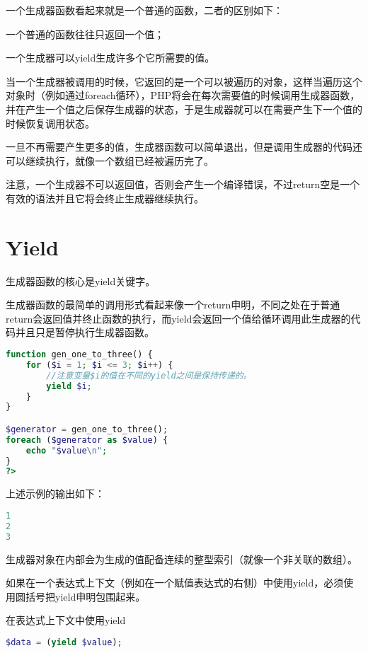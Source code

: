 一个生成器函数看起来就是一个普通的函数，二者的区别如下：

\begin{compactitem}
\item 一个普通的函数往往只返回一个值；
\item 一个生成器可以yield生成许多个它所需要的值。
\end{compactitem}

当一个生成器被调用的时候，它返回的是一个可以被遍历的对象，这样当遍历这个对象时（例如通过foreach循环），PHP将会在每次需要值的时候调用生成器函数，并在产生一个值之后保存生成器的状态，于是生成器就可以在需要产生下一个值的时候恢复调用状态。

一旦不再需要产生更多的值，生成器函数可以简单退出，但是调用生成器的代码还可以继续执行，就像一个数组已经被遍历完了。

注意，一个生成器不可以返回值，否则会产生一个编译错误，不过return空是一个有效的语法并且它将会终止生成器继续执行。

\section{Yield}

生成器函数的核心是yield关键字。

生成器函数的最简单的调用形式看起来像一个return申明，不同之处在于普通return会返回值并终止函数的执行，而yield会返回一个值给循环调用此生成器的代码并且只是暂停执行生成器函数。

\begin{lstlisting}[language=PHP]
function gen_one_to_three() {
    for ($i = 1; $i <= 3; $i++) {
        //注意变量$i的值在不同的yield之间是保持传递的。
        yield $i;
    }
}

$generator = gen_one_to_three();
foreach ($generator as $value) {
    echo "$value\n";
}
?>
\end{lstlisting}

上述示例的输出如下：

\begin{lstlisting}[language=PHP]
1
2
3
\end{lstlisting}

生成器对象在内部会为生成的值配备连续的整型索引（就像一个非关联的数组）。

如果在一个表达式上下文（例如在一个赋值表达式的右侧）中使用yield，必须使用圆括号把yield申明包围起来。

\begin{example}
在表达式上下文中使用yield
\begin{lstlisting}[language=PHP]
$data = (yield $value);
\end{lstlisting}
\end{example}

